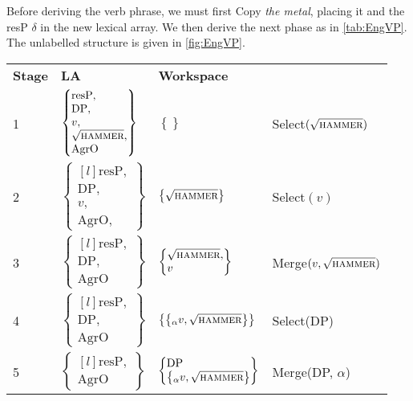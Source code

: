 \documentclass[MilwayThesis]{subfiles}
\begin{document}
Before deriving the verb phrase, we must first Copy \textit{the metal}, placing it and the resP $\delta$ in the new lexical array.
We then derive the next phase as in \autoref{tab:EngVP}.
The unlabelled structure is given in \autoref{fig:EngVP}.
\begin{longtabu}{llll}
\textbf{Stage} & \textbf{LA} & \textbf{Workspace} &\\
1 & $
\begin{Bmatrix*}[l]
	\text{resP},\\
	\text{DP},\\
	v,\\
	\sqrt{\textsc{hammer}},\\
	\text{AgrO}
\end{Bmatrix*}
$ & $\left\{  \right\}$ & Select$(\sqrt{\textsc{hammer}})$\\
2 & $
\begin{Bmatrix*}[l]
	\text{resP},\\
	\text{DP},\\
	v,\\
	\text{AgrO},
\end{Bmatrix*}
$ & $\left\{ \sqrt{\textsc{hammer}} \right\}$ & Select$(v)$\\
3 & $
\begin{Bmatrix*}[l]
	\text{resP},\\
	\text{DP},\\
	\text{AgrO}
\end{Bmatrix*}
$ & $ 
\begin{Bmatrix*}[l]
	\sqrt{\textsc{hammer}},\\
	v
\end{Bmatrix*}
$ & Merge$(v, \sqrt{\textsc{hammer}})$\\
4 & $
\begin{Bmatrix*}[l]
	\text{resP},\\
	\text{DP},\\
	\text{AgrO}
\end{Bmatrix*}
$ & $ 
\left\{\left\{_\alpha v, \sqrt{\textsc{hammer}}\right\}\right\}
$ & Select(DP)\\
5 & $
\begin{Bmatrix*}[l]
	\text{resP},\\
	\text{AgrO}
\end{Bmatrix*}
$ & $ 
\begin{Bmatrix*}[l]
	\text{DP}\\
	\left\{_\alpha v, \sqrt{\textsc{hammer}}\right\}
\end{Bmatrix*}
$ & Merge(DP, $\alpha$)\\

\end{longtabu}
\end{document}
